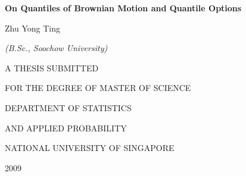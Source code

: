 \thispagestyle{empty}
\vspace{2cm}
\begin{center}\Large \bf
On Quantiles of Brownian Motion and Quantile Options

\vfill

Zhu Yong Ting

\textit{(B.Sc., Soochow University)}

\vfill

\normalsize
A THESIS SUBMITTED

\vspace{1em}

FOR THE DEGREE OF MASTER OF SCIENCE

\vspace{1em}

DEPARTMENT OF STATISTICS 

\vspace{1em}

AND APPLIED PROBABILITY

\vspace{1em}
\large
NATIONAL UNIVERSITY OF SINGAPORE

\vspace{1em}

2009

\end{center}

\vspace*{1cm}

\pagebreak
